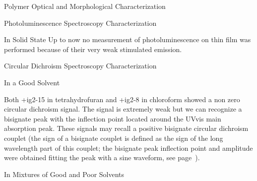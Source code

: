 \begin{section}{Polymer Optical and Morphological Characterization}
\begin{subsection}{Photoluminescence Spectroscopy Characterization}
\begin{subsubsection}{In Solid State}
Up to now no measurement of photoluminescence on thin film was performed because of their very weak stimulated emission.

\end{subsubsection}
\end{subsection}
\clearpage
\begin{subsection}{Circular Dichroism Spectroscopy Characterization}
\begin{subsubsection}{In a Good Solvent}

Both \cmpd+{ig2-15} in tetrahydrofuran and \cmpd+{ig2-8} in chloroform showed a non zero circular dichroism signal. The signal is extremely weak but we can recognize a bisignate peak 
with the inflection point located around the \gls{UVvis} main absorption peak. These signals may recall a 
positive bisignate circular dichroism couplet (the sign of a bisignate couplet is defined as the sign of the long wavelength part of this couplet; the bisignate peak inflection point and amplitude were obtained fitting the peak with a sine waveform, see page~\pageref{fitting}). 

\end{subsubsection}
\begin{subsubsection}{In Mixtures of Good and Poor Solvents}
\label{sec:cd-poor}


\end{subsubsection}
\end{subsection}
\end{section}
